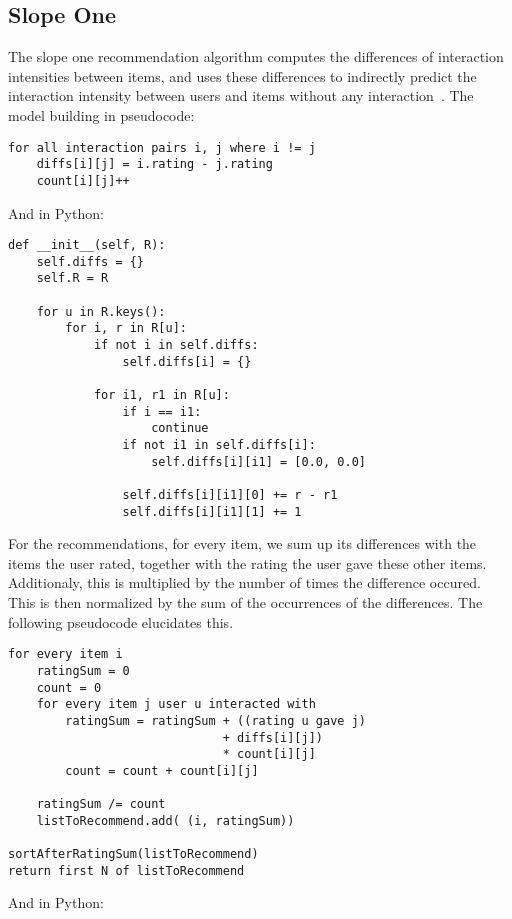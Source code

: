 \subsection{Slope One}
The slope one recommendation algorithm computes the differences of
interaction intensities between items, and uses these differences to indirectly 
predict the interaction intensity between users and items
without any interaction~\cite{DBLP:journals/corr/abs-cs-0702144}.
The model building in pseudocode:
\begin{lstlisting}[style=pseudocode]
for all interaction pairs i, j where i != j
    diffs[i][j] = i.rating - j.rating
    count[i][j]++
\end{lstlisting}
And in Python:
\begin{lstlisting}[style=python]
def __init__(self, R):
    self.diffs = {}
    self.R = R

    for u in R.keys():
        for i, r in R[u]:
            if not i in self.diffs:
                self.diffs[i] = {}

            for i1, r1 in R[u]:
                if i == i1:
                    continue
                if not i1 in self.diffs[i]:
                    self.diffs[i][i1] = [0.0, 0.0]

                self.diffs[i][i1][0] += r - r1
                self.diffs[i][i1][1] += 1
\end{lstlisting}
For the recommendations, for every item, we sum up its differences with
the items the user rated, together with the rating the user gave these
other items. Additionaly, this is multiplied by the number of times the
difference occured. This is then normalized by the sum of the occurrences
of the differences. The following pseudocode elucidates this.
\begin{lstlisting}[style=pseudocode]
for every item i
    ratingSum = 0
    count = 0
    for every item j user u interacted with
        ratingSum = ratingSum + ((rating u gave j) 
                              + diffs[i][j])
                              * count[i][j]
        count = count + count[i][j]

    ratingSum /= count
    listToRecommend.add( (i, ratingSum))

sortAfterRatingSum(listToRecommend)
return first N of listToRecommend
\end{lstlisting}
And in Python:
